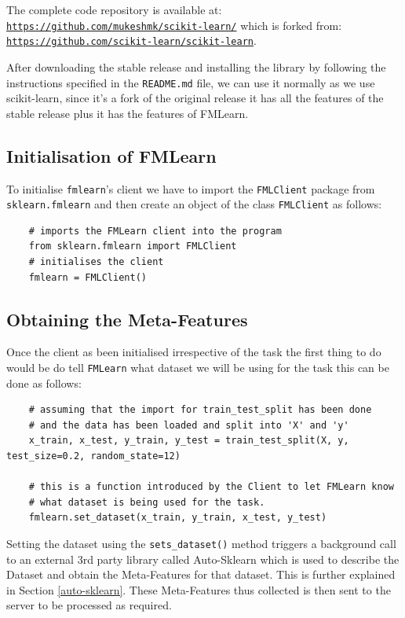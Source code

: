 The complete code repository is available at: \href{https://github.com/mukeshmk/scikit-learn/}{\texttt{https://github.com/mukeshmk/scikit-learn/}} \newline which is forked from: \href{https://github.com/scikit-learn/scikit-learn}{\texttt{https://github.com/scikit-learn/scikit-learn}}.

After downloading the stable release and installing the library by following the instructions specified in the \texttt{README.md} file, we can use it normally as we use scikit-learn, since it's a fork of the original release it has all the features of the stable release plus it has the features of FMLearn.

\subsection*{Initialisation of FMLearn}

To initialise \texttt{fmlearn}'s client we have to import the \texttt{FMLClient} package from \texttt{sklearn.fmlearn} and then create an object of the class \texttt{FMLClient} as follows:
\begin{lstlisting}
    # imports the FMLearn client into the program
    from sklearn.fmlearn import FMLClient
    # initialises the client
    fmlearn = FMLClient()
\end{lstlisting}

\subsection*{Obtaining the Meta-Features}

Once the client as been initialised irrespective of the task the first thing to do would be do tell \texttt{FMLearn} what dataset we will be using for the task this can be done as follows:

\begin{lstlisting}
    # assuming that the import for train_test_split has been done
    # and the data has been loaded and split into 'X' and 'y'
    x_train, x_test, y_train, y_test = train_test_split(X, y, test_size=0.2, random_state=12)

    # this is a function introduced by the Client to let FMLearn know 
    # what dataset is being used for the task.
    fmlearn.set_dataset(x_train, y_train, x_test, y_test)
\end{lstlisting}

Setting the dataset using the \texttt{sets\_dataset()} method triggers a background call to an external 3rd party library called Auto-Sklearn which is used to describe the Dataset and obtain the Meta-Features for that dataset. This is further explained in Section \ref{auto-sklearn}. These Meta-Features thus collected is then sent to the server to be processed as required.

